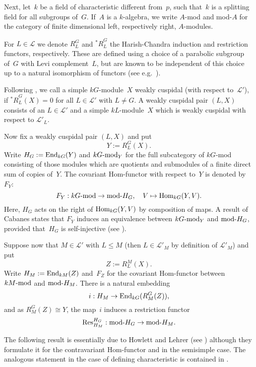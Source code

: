 \documentclass[twoside,12pt]{amsart}
\theoremstyle{plain}
\begin{document}
Next, let~$k$ be a field of characteristic different from~$p$, such that~$k$
is a splitting field for all subgroups of~$G$. If~$A$ is a $k$-algebra, we write 
$A$-mod and mod-$A$ for the category of finite dimensional left, respectively 
right, $A$-modules. 

For $L \in \mathcal{L}$ we denote $R_L^G$ and ${^*\!R}_L^G$ the Harish-Chandra
induction and restriction functors, respectively. These are defined using a
choice of a parabolic subgroup of~$G$ with Levi complement~$L$, but are
known to be independent of this choice up to a natural isomorphism of functors
(see e.g.\ \cite[Theorem~$3.10$]{CabanesEnguehard2004}).

Following \cite[Section 2.3]{GerberHissJacon2014}, we call a simple 
$kG$-module~$X$ weakly cuspidal (with 
respect to~$\mathcal{L}'$), if ${^*\!R}_L^G(X) = 0$ for all $L \in \mathcal{L}'$ 
with $L \neq G$. A weakly cuspidal pair $(L,X)$ consists of an $L \in 
\mathcal{L'}$ and a simple $kL$-module~$X$ which is weakly cuspidal with respect 
to $\mathcal{L'}_L$. 

Now fix a weakly cuspidal pair $(L,X)$ and put 
$$Y := R_L^G(X).$$
Write $H_G := {\mbox{\rm End}}_{kG}( Y )$ and $kG\mbox{\rm -mod}_Y$
for the full subcategory of $kG$-mod consisting of those modules which are
quotients and submodules of a finite direct sum of copies of~$Y$. The 
covariant Hom-functor with respect to~$Y$ is denoted by~$F_Y$:
$$F_Y: kG\mbox{\rm -mod} \rightarrow \mbox{\rm mod-}H_G,\quad V \mapsto 
{\mbox{\rm Hom}}_{kG}(Y,V).$$
Here, $H_G$ acts on the right of ${\mbox{\rm Hom}}_{kG}(Y,V)$ by composition of maps.
A result of Cabanes states that $F_Y$ induces an equivalence 
between $kG\mbox{\rm -mod}_Y$ and $\mbox{\rm mod-}H_G$, provided 
that~$H_G$ is self-injective (see \cite[Theorem 2]{Cabanes1990}).

Suppose now that $M \in \mathcal{L}'$ with $L \leq M$ (then $L \in 
\mathcal{L}'_M$ by definition of $\mathcal{L}'_M$) and put
$$Z := R_L^M(X).$$
Write $H_M := {\mbox{\rm End}}_{kM}(Z)$ and~$F_Z$ for the covariant
Hom-functor between $kM\mbox{\rm -mod}$ and $\mbox{\rm mod-}H_M$.
There is a natural embedding 
$$i : H_M \rightarrow {\mbox{\rm End}}_{kG}( R_M^G( Z ) ),$$
and as $R_M^G(Z) \cong Y$, the map~$i$
induces a restriction functor
$${\mbox{\rm Res}}^{H_G}_{H_M}: \mbox{\rm mod-}H_G \rightarrow \mbox{\rm mod-}H_M.$$

The following result is essentially due to Howlett and Lehrer (see
\cite[Theorem 1.13]{HowlettLehrer1983}) although they formulate it for the
contravariant Hom-functor and in the semisimple case. 
The analogous statement in the case of defining characteristic is
contained in \cite[2.3]{Cabanes1990}.
\end{document}
